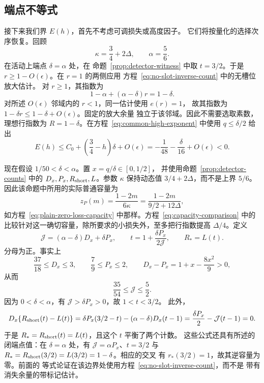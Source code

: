 \subsection{端点不等式}\label{sec:adaptive-endpoint}

接下来我们界 \(E(h)\)，首先不考虑可调损失或高度因子。
它们将按量化的选择次序恢复。回顾
\[
 \kappa=\frac34+2\Delta,\qquad \alpha=\frac56.
\]
在活动上端点 \(\delta=\alpha\) 处，在
命题~\ref{prop:detector-witness} 中取 \(t=3/2\)。于是
\(r\ge1-O(\epsilon)\)。在 \(r=1\) 的两侧应用
方程~\eqref{eq:no-slot-inverse-count} 中的无槽位放大估计。
对 \(r\ge1\)，其指数为
\[
 1-\alpha+(\alpha-\delta)r=1-\delta.
\]
对所述 \(O(\epsilon)\) 邻域内的 \(r<1\)，同一估计使用 \(e(r)=1\)，
故其指数为 \(1-\delta r\le1-\delta+O(\epsilon)\)。固定的放大余量
独立于该邻域。因此不需要选取素数，理想行指数为
\(R=1-\delta\)。在方程~\eqref{eq:common-high-exponent} 中使用
\(q\le\delta/2\) 给出
\begin{equation}
 E(h)\le C_0+\left(\frac34-h\right)\delta+O(\epsilon)
       =-\frac1{48}-\frac{\delta}{16}+O(\epsilon)<0.
 \label{eq:large-delta-endpoint}
\end{equation}

现在假设 \(1/50<\delta<\alpha\)。置 \(x=q/\delta\in[0,1/2]\)，
并使用命题~\ref{prop:detector-counts} 中的
\(D_x,P_x,R_{\rm short},L\)。参数 \(\kappa\)
保持动态值 \(3/4+2\Delta\)，而不是上界
\(5/6\)。因此该命题中所用的实际普通容量为
\[
 z_P(m)=\frac{1-2m}{6\kappa}
       =\frac{1-2m}{9/2+12\Delta},
\]
如方程~\eqref{eq:plain-zero-loss-capacity} 中那样。方程~\eqref{eq:capacity-comparison}
中的比较针对这一确切容量，除所要求的小损失外，至多把行指数提高
\(\Delta/4\)。定义
\begin{equation}
 \mathcal J=(\alpha-\delta)D_x+\delta P_x,\qquad
 t=1+\frac{\delta P_x}{2\mathcal J},\qquad
 R_*=L(t).
 \label{eq:target-cutoff}
\end{equation}
分母为正。事实上
\[
 \frac{37}{18}\le D_x\le3,\qquad
 \frac79\le P_x\le2,\qquad
 D_x-P_x=1+x-\frac{8x^2}{9}>0,
\]
从而
\[
 \frac{35}{54}\le\mathcal J\le\frac52.
\]
因为 \(0<\delta<\alpha\)，有
\(\mathcal J>\delta P_x>0\)，故 \(1<t<3/2\)。
此外，
\[
 D_x\{R_{\rm short}(t)-L(t)\}
 =\delta P_x(3/2-t)-(\alpha-\delta)D_x(t-1)
 =\frac{\delta P_x}{2}-\mathcal J(t-1)=0.
\]
于是 \(R_*=R_{\rm short}(t)=L(t)\)，且这个 \(t\) 平衡了两个计数。
这些公式还具有所述的闭端点值：在
\(\delta=\alpha\) 处，有 \(\mathcal J=\alpha P_x\)、\(t=3/2\) 与
\(R_*=R_{\rm short}(3/2)=L(3/2)=1-\delta\)。相应的交叉
有 \(r_*(3/2)=1\)，故其逆容量为零。前面的
等式论证在该边界处使用方程~\eqref{eq:no-slot-inverse-count}，而不是
带有消失余量的带标记估计。

